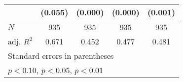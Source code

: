 {\begin{tabular}{l*{4}{c}}
            &     (0.055)         &     (0.000)         &     (0.000)         &     (0.001)         \\
\hline
\(N\)       &         935         &         935         &         935         &         935         \\
adj. \(R^{2}\)&       0.671         &       0.452         &       0.477         &       0.481         \\
\hline\hline
\multicolumn{5}{l}{\footnotesize Standard errors in parentheses}\\
\multicolumn{5}{l}{\footnotesize \sym{*} \(p<0.10\), \sym{**} \(p<0.05\), \sym{***} \(p<0.01\)}\\
\end{tabular}
}
